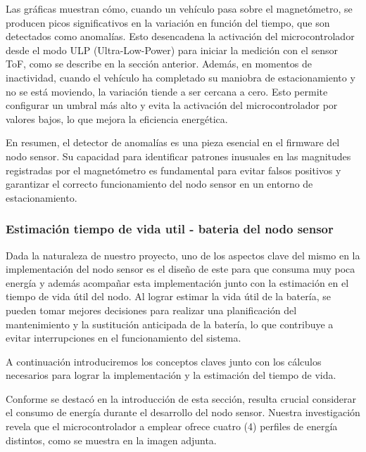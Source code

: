 Las gráficas muestran cómo, cuando un vehículo pasa sobre el magnetómetro, se producen picos significativos en la variación en función del tiempo, que son detectados como anomalías. Esto desencadena la activación del microcontrolador desde el modo ULP (Ultra-Low-Power) para iniciar la medición con el sensor ToF, como se describe en la sección anterior. Además, en momentos de inactividad, cuando el vehículo ha completado su maniobra de estacionamiento y no se está moviendo, la variación tiende a ser cercana a cero. Esto permite configurar un umbral más alto y evita la activación del microcontrolador por valores bajos, lo que mejora la eficiencia energética.

En resumen, el detector de anomalías es una pieza esencial en el firmware del nodo sensor. Su capacidad para identificar patrones inusuales en las magnitudes registradas por el magnetómetro es fundamental para evitar falsos positivos y garantizar el correcto funcionamiento del nodo sensor en un entorno de estacionamiento.



\subsubsection{Estimación tiempo de vida util - bateria del nodo sensor}{\label{sec:bateria_del_nodo_sensor}}
Dada la naturaleza de nuestro proyecto, uno de los aspectos clave del mismo en la
implementación del nodo sensor es el diseño de este para que consuma muy poca energía y
además acompañar esta implementación junto con la estimación en el tiempo de vida útil
del nodo.
Al lograr estimar la vida útil de la batería, se pueden tomar mejores decisiones para
realizar una planificación del mantenimiento y la sustitución anticipada de la batería,
lo que contribuye a evitar interrupciones en el funcionamiento del sistema.

A continuación introduciremos los conceptos claves junto con los cálculos necesarios
para lograr la implementación y la estimación del tiempo de vida.

Conforme se destacó en la introducción de esta sección, resulta crucial considerar el
consumo de energía durante el desarrollo del nodo sensor. Nuestra investigación revela
que el microcontrolador a emplear ofrece cuatro (4) perfiles de energía distintos, como
se muestra en la imagen adjunta.


